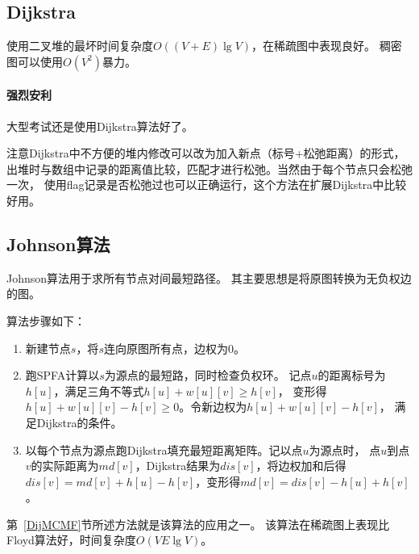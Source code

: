 \subsection{Dijkstra}
使用二叉堆的最坏时间复杂度$O((V+E)\lg V)$，在稀疏图中表现良好。
稠密图可以使用$O(V^2)$暴力。
\paragraph{强烈安利}
大型考试还是使用Dijkstra算法好了。

注意Dijkstra中不方便的堆内修改可以改为加入新点（标号+松弛距离）的形式，
出堆时与数组中记录的距离值比较，匹配才进行松弛。当然由于每个节点只会松弛一次，
使用flag记录是否松弛过也可以正确运行，这个方法在扩展Dijkstra中比较好用。
\subsection{Johnson算法}
Johnson算法用于求所有节点对间最短路径。
其主要思想是将原图转换为无负权边的图。

算法步骤如下：
\begin{enumerate}
    \item 新建节点$s$，将$s$连向原图所有点，边权为0。
    \item 跑SPFA计算以$s$为源点的最短路，同时检查负权环。
    记点$u$的距离标号为$h[u]$，满足三角不等式$h[u]+w[u][v]\geq h[v]$，
    变形得$h[u]+w[u][v]-h[v]\geq 0$。令新边权为$h[u]+w[u][v]-h[v]$，
    满足Dijkstra的条件。
    \item 以每个节点为源点跑Dijkstra填充最短距离矩阵。记以点$u$为源点时，
    点$u$到点$v$的实际距离为$md[v]$，Dijkstra结果为$dis[v]$，将边权加和后得
    $dis[v]=md[v]+h[u]-h[v]$，变形得$md[v]=dis[v]-h[u]+h[v]$。
\end{enumerate}

第~\ref{DijMCMF}节所述方法就是该算法的应用之一。
该算法在稀疏图上表现比Floyd算法好，时间复杂度$O(VE\lg V)$。
